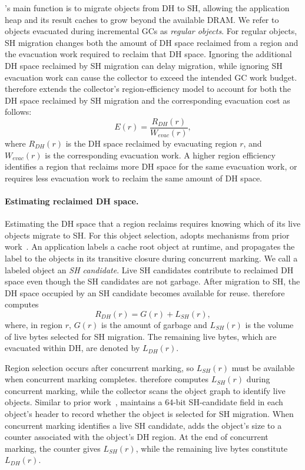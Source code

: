 \chipperName{}'s main function is to migrate objects from DH to SH, allowing the application heap and its result caches to grow beyond the available DRAM.
We refer to objects evacuated during incremental GCs as \emph{regular objects}.
For regular objects, SH migration changes both the amount of DH space reclaimed from a region and the evacuation work required to reclaim that DH space.
Ignoring the additional DH space reclaimed by SH migration can delay migration, while ignoring SH evacuation work can cause the collector to exceed the intended GC work budget.
\chipperName{} therefore extends the collector's region-efficiency model to account for both the DH space reclaimed by SH migration and the corresponding evacuation cost as follows:
%
\begin{equation}
	E(r) = \frac{R_{DH}(r)} {W_{\mathit{evac}}(r)},
\end{equation}
%
where $R_{DH}(r)$ is the DH space reclaimed by evacuating region $r$, and $W_{\mathit{evac}}(r)$ is the corresponding evacuation work.
A higher region efficiency identifies a region that reclaims more DH space for the same evacuation work, or requires less evacuation work to reclaim the same amount of DH space.

\paragraph{\textbf{Estimating reclaimed DH space.}}
Estimating the DH space that a region reclaims requires knowing which of its live objects migrate to SH.
For this object selection, \chipperName{} adopts mechanisms from prior work~\cite{wang:bridgegc,khanh:yak,teraheap,leaksurvivor, kolokasis:teracache,bond:melt,khanh:polar}.
An application labels a cache root object at runtime, and \chipperName{} propagates the label to the objects in its transitive closure during concurrent marking.
We call a labeled object an \emph{SH candidate}.
Live SH candidates contribute to reclaimed DH space even though the SH candidates are not garbage.
After migration to SH, the DH space occupied by an SH candidate becomes available for reuse.
\chipperName{} therefore computes
%
\begin{equation}
	R_{DH}(r) = G(r) + L_{SH}(r),
\end{equation}
%
where, in region $r$, $G(r)$ is the amount of garbage and $L_{SH}(r)$ is the volume of live bytes selected for SH migration.
The remaining live bytes, which are evacuated within DH, are denoted by $L_{DH}(r)$.

Region selection occurs after concurrent marking, so $L_{SH}(r)$ must be available when concurrent marking completes.
\chipperName{} therefore computes $L_{SH}(r)$ during concurrent marking, while the collector scans the object graph to identify live objects.
Similar to prior work~\cite{wu:espresso,teraheap}, \chipperName{} maintains a 64-bit SH-candidate field in each object's header to record whether the object is selected for SH migration.
When concurrent marking identifies a live SH candidate, \chipperName{} adds the object's size to a counter associated with the object's DH region.
At the end of concurrent marking, the counter gives $L_{SH}(r)$, while the remaining live bytes constitute $L_{DH}(r)$.

